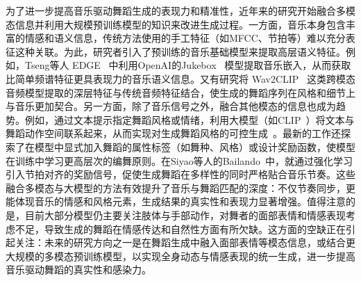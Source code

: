 为了进一步提高音乐驱动舞蹈生成的表现力和精准性，近年来的研究开始融合多模态信息并利用大规模预训练模型的知识来改进生成过程。一方面，音乐本身包含丰富的情感和语义信息，传统方法使用的手工特征（如MFCC、节拍等）难以充分表征这种关联。为此，研究者引入了预训练的音乐基础模型来提取高层语义特征。例如，Tseng等人 EDGE~\cite{tseng2023edge} 中利用OpenAI的Jukebox~\cite{dhariwal2020jukebox} 模型提取音乐嵌入，从而获取比简单频谱特征更具表现力的音乐语义信息。又有研究将 Wav2CLIP~\cite{wu2022wav2clip} 这类跨模态音频模型提取的深层特征与传统音频特征结合，使生成的舞蹈序列在风格和细节上与音乐更加契合。另一方面，除了音乐信号之外，融合其他模态的信息也成为趋势。例如，通过文本提示指定舞蹈风格或情绪，利用大模型（如CLIP~\cite{radford2021learning}）将文本与舞蹈动作空间联系起来，从而实现对生成舞蹈风格的可控生成~\cite{tevet2022motionclip}。最新的工作还探索了在模型中显式加入舞蹈的属性标签（如舞种、风格）或设计奖励函数，使模型在训练中学习更高层次的编舞原则。在Siyao等人的Bailando~\cite{siyao2022bailando}中，就通过强化学习引入节拍对齐的奖励信号，促使生成舞蹈在多样性的同时严格贴合音乐节奏。这些融合多模态与大模型的方法有效提升了音乐与舞蹈匹配的深度：不仅节奏同步，更能体现音乐的情感和风格元素，生成结果的真实性和表现力显著增强。值得注意的是，目前大部分模型仍主要关注肢体与手部动作，对舞者的面部表情和情感表现考虑不足，导致生成的舞蹈在情感传达和自然性方面有所欠缺。这方面的空缺正在引起关注：未来的研究方向之一是在舞蹈生成中融入面部表情等模态信息，或结合更大规模的多模态预训练模型，以实现全身动态与情感表现的统一生成，进一步提高音乐驱动舞蹈的真实性和感染力。
